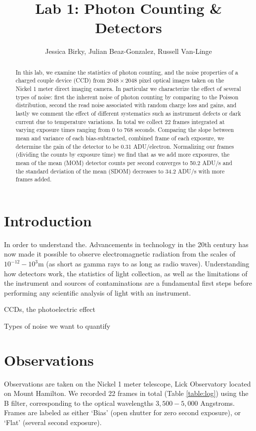 \documentclass[preprint]{aastex62}
\begin{document}
\title{\sc Lab 1: Photon Counting \& Detectors}
\author{Jessica Birky, Julian Beaz-Gonzalez, Russell Van-Linge}


\begin{abstract}
In this lab, we examine the statistics of photon counting, and the noise properties of a charged couple device (CCD) from $2048\times2048$ pixel optical images taken on the Nickel 1 meter direct imaging camera. In particular we characterize the effect of several types of noise: first the inherent noise of photon counting by comparing to the Poisson distribution, second the read noise associated with random charge loss and gains, and lastly we comment the effect of different systematics such as instrument defects or dark current due to temperature variations. In total we collect 22 frames integrated at varying exposure times ranging from 0 to 768 seconds. Comparing the slope between mean and variance of each bias-subtracted, combined frame of each exposure, we determine the gain of the detector to be 0.31 ADU/electron. Normalizing our frames (dividing the counts by exposure time) we find that as we add more exposures, the mean of the mean (MOM) detector counts per second converges to 50.2 ADU/s and the standard deviation of the mean (SDOM) decreases to 34.2 ADU/s with more frames added.

\end{abstract}
\bigskip

\section{Introduction} 
In order to understand the. Advancements in technology in the 20th century has now made it possible to observe electromagnetic radiation from the scales of $10^{-12}-10^3$m (as short as gamma rays to as long as radio waves). Understanding how detectors work, the statistics of light collection, as well as the limitations of the instrument and sources of contaminations are a fundamental first steps before performing any scientific analysis of light with an instrument.

CCDs, the photoelectric effect

Types of noise we want to quantify

\section{Observations}
Observations are taken on the Nickel 1 meter telescope, Lick Observatory located on Mount Hamilton. We recorded 22 frames in total (Table \ref{table:log}) using the B filter, corresponding to the optical wavelengths $3,500-5,000$ Angstroms. Frames are labeled as either `Bias' (open shutter for zero second exposure), or `Flat' (several second exposure).
\end{document}
